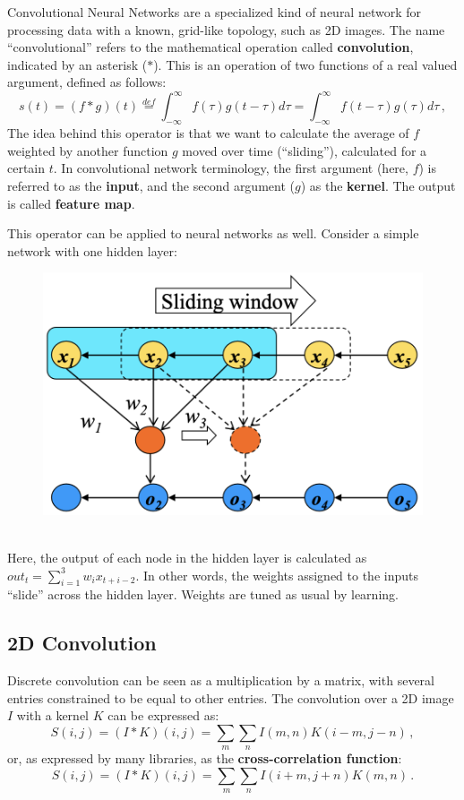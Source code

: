 Convolutional Neural Networks are a specialized kind of neural network for processing data with a known, grid-like topology, such as 2D images. The name ``convolutional'' refers to the mathematical operation called \textbf{convolution}, indicated by an asterisk ($*$). This is an operation of two functions of a real valued argument, defined as follows:
\begin{equation*}
    s(t) = (f * g)(t) \stackrel{def}{=} \int_{-\infty}^{\infty} f(\tau)g(t - \tau) d \tau = \int_{-\infty}^{\infty} f(t - \tau)g(\tau) d\tau \,,
\end{equation*}
The idea behind this operator is that we want to calculate the average of $f$ weighted by another function $g$ moved over time (``sliding''), calculated for a certain $t$. In convolutional network terminology, the first argument (here, $f$) is referred to as the \textbf{input}, and the second argument ($g$) as the \textbf{kernel}. The output is called \textbf{feature map}.

This operator can be applied to neural networks as well. Consider a simple network with one hidden layer:
\begin{figure}[ht]
    \centering
    \includegraphics[width=0.45\linewidth]{img/CNN_simple.png}
\end{figure} \\
Here, the output of each node in the hidden layer is calculated as $out_t = \sum_{i=1}^3 w_i x_{t+i-2}$. In other words, the weights assigned to the inputs ``slide'' across the hidden layer. Weights are tuned as usual by learning.

\subsection{2D Convolution}

Discrete convolution can be seen as a multiplication by a matrix, with several entries constrained to be equal to other entries. The convolution over a 2D image $I$ with a kernel $K$ can be expressed as:
\begin{equation*}
    S(i,j) = (I*K)(i,j) = \sum_m \sum_n I(m,n)K(i-m, j-n) \,,
\end{equation*}
or, as expressed by many libraries, as the \textbf{cross-correlation function}:
\begin{equation*}
    S(i,j) = (I*K)(i,j) = \sum_m \sum_n I(i+m,j+n)K(m, n) \,.
\end{equation*}

